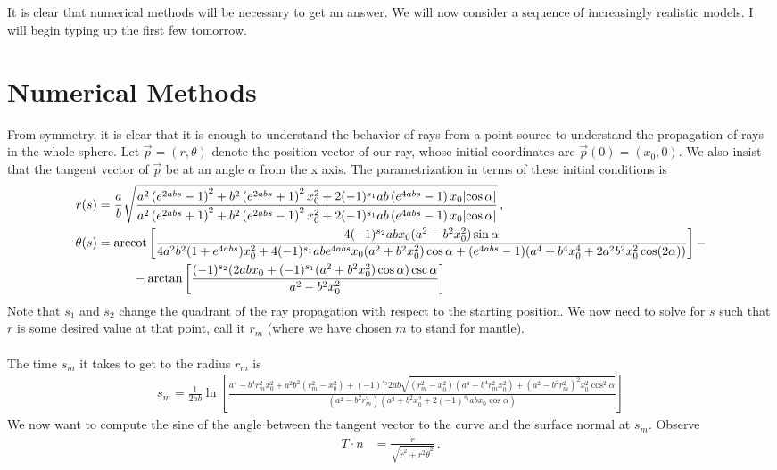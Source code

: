 \documentclass{article}
\newcommand*\p[1]{\left(#1\right)}
\newcommand*\ps[1]{\left[#1\right]}
\newcommand*\f[2]{\frac{#1}{#2}}
\begin{document}
\\\\
It is clear that numerical methods will be necessary to get an answer. We will now consider a sequence of increasingly realistic models. I will begin typing up the first few tomorrow.

\pagebreak
\section{Numerical Methods}
From symmetry, it is clear that it is enough to understand the behavior of rays from a point source to understand the propagation of rays in the whole sphere. Let $\vec p=(r,\theta)$ denote the position vector of our ray, whose initial coordinates are $\vec p(0)=(x_0,0)$. We also insist that the tangent vector of $\vec p$ be at an angle $\alpha$ from the x axis. The parametrization in terms of these initial conditions is
\begin{align}
r(s)&=\f{a}{b}\sqrt{\f{a^2\p{e^{2abs}-1}^2+b^2\p{e^{2abs}+1}^2x_0^2+2(-1)^{s_1}ab\p{e^{4abs}-1}x_0\abs{\cos\alpha}}{a^2\p{e^{2abs}+1}^2+b^2\p{e^{2abs}-1}^2x_0^2+2(-1)^{s_1}ab\p{e^{4abs}-1}x_0\abs{\cos\alpha}}}\,,\\
\notag\theta(s)&=\arccot\ps{\f{4(-1)^{s_2}abx_0(a^2-b^2x_0^2)\sin\alpha}{4a^2b^2(1+e^{4abs})x_0^2+4(-1)^{s_1}abe^{4abs}x_0(a^2+b^2x_0^2)\cos\alpha+(e^{4abs}-1)(a^4+b^4x_0^4+2a^2b^2x_0^2\cos(2\alpha))}}-\\
&\hspace{1cm}-\arctan\ps{\f{(-1)^{s_2}(2abx_0+(-1)^{s_1}(a^2+b^2x_0^2)\cos\alpha)\csc\alpha}{a^2-b^2x_0^2}}
\end{align}
Note that $s_1$ and $s_2$ change the quadrant of the ray propagation with respect to the starting position. We now need to solve for $s$ such that $r$ is some desired value at that point, call it $r_m$ (where we have chosen $m$ to stand for mantle).
\\\\
The time $s_m$ it takes to get to the radius $r_m$ is
\begin{align}
s_m=\f{1}{2ab}\ln\ps{\f{a^4-b^4 r_m^2 x_0^2+a^2b^2(r_m^2-x_0^2)+(-1)^{s_3} 2ab\sqrt{(r_m^2-x_0^2)(a^4-b^4 r_m^2x_0^2)+(a^2-b^2r_m^2)^2x_0^2\cos^2\alpha}}{(a^2-b^2r_m^2)(a^2+b^2x_0^2+2(-1)^{s_1}abx_0\cos\alpha)}}
\end{align}
We now want to compute the sine of the angle between the tangent vector to the curve and the surface normal at $s_m$. Observe
\begin{align}
T\cdot n&=\f{\dot r}{\sqrt{\dot r^2+r^2\dot\theta^2}}\,.
\end{align}
\end{document}
